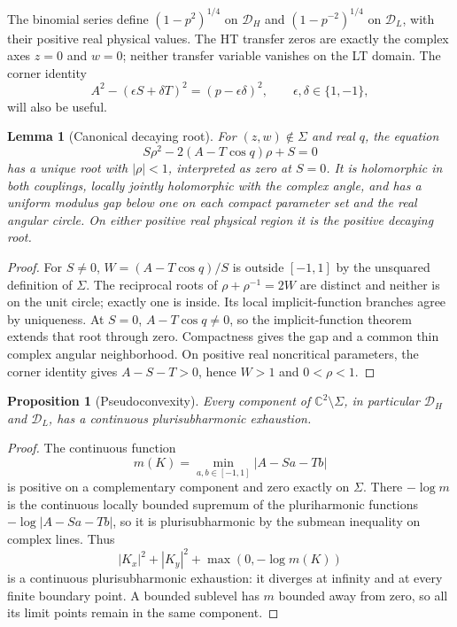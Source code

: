 \documentclass[11pt]{article}
\numberwithin{equation}{section}
\newtheorem{lemma}[theorem]{Lemma}
\newtheorem{proposition}[theorem]{Proposition}
\theoremstyle{definition}
\begin{document}
The binomial series define $(1-p^2)^{1/4}$ on $\mathcal D_H$ and
$(1-p^{-2})^{1/4}$ on $\mathcal D_L$, with their positive real
physical values.  The HT transfer zeros are exactly the complex
axes $z=0$ and $w=0$; neither transfer variable vanishes on the LT
domain.
The corner identity
\begin{equation}\label{geo:corner}
 A^2-(\epsilon S+\delta T)^2=(p-\epsilon\delta)^2,
 \qquad \epsilon,\delta\in\{1,-1\},
\end{equation}
will also be useful.

\begin{lemma}[Canonical decaying root]\label{geo:canonical-root}
For $(z,w)\notin\Sigma$ and real $q$, the equation
\begin{equation}\label{geo:root-equation}
 S\rho^2-2(A-T\cos q)\rho+S=0
\end{equation}
has a unique root with $|\rho|<1$, interpreted as zero at $S=0$.
It is holomorphic in both couplings, locally jointly holomorphic
with the complex angle, and has a uniform modulus gap below one
on each compact parameter set and the real angular circle.
On either positive real physical region it is the positive decaying root.
\end{lemma}
\begin{proof}
For $S\ne0$, $W=(A-T\cos q)/S$ is outside $[-1,1]$ by the unsquared
definition of $\Sigma$.  The reciprocal roots of
$\rho+\rho^{-1}=2W$ are distinct and neither is on the unit circle;
exactly one is inside.  Its local implicit-function branches agree
by uniqueness.  At $S=0$, $A-T\cos q\ne0$, so the implicit-function
theorem extends that root through zero.  Compactness gives the gap
and a common thin complex angular neighborhood.  On positive real
noncritical parameters, the corner identity gives $A-S-T>0$, hence
$W>1$ and $0<\rho<1$.
\end{proof}

\begin{proposition}[Pseudoconvexity]\label{geo:pseudoconvex}
Every component of $\mathbb C^2\setminus\Sigma$, in particular
$\mathcal D_H$ and $\mathcal D_L$, has a continuous
plurisubharmonic exhaustion.
\end{proposition}
\begin{proof}
The continuous function
\[
 m(K)=\min_{a,b\in[-1,1]}|A-Sa-Tb|
\]
is positive on a complementary component and zero exactly on $\Sigma$.
There $-\log m$ is the continuous locally bounded supremum of the
pluriharmonic functions $-\log|A-Sa-Tb|$, so it is plurisubharmonic
by the submean inequality on complex lines.  Thus
\[
 |K_x|^2+|K_y|^2+\max(0,-\log m(K))
\]
is a continuous plurisubharmonic exhaustion: it diverges at infinity
and at every finite boundary point.  A bounded sublevel has $m$ bounded
away from zero, so all its limit points remain in the same component.
\end{proof}
\end{document}

